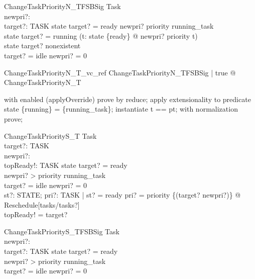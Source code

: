 \begin{schema}{ChangeTaskPriorityN\_TFSBSig}
  Task\\
  newpri?: \nat \\
  target?: TASK
\where
  state target? = ready \implies  newpri? \leq  priority running\_task\\
  state target? = running \implies  (\forall  t: state \inv  \limg  \{ready\} \rimg  @ newpri? \geq  priority t)\\
  state target? \neq  nonexistent\\
  target? = idle \implies  newpri? = 0
\end{schema}

\begin{theorem}{ChangeTaskPriorityN\_T\_vc\_ref}
\forall  ChangeTaskPriorityN\_TFSBSig | true @ \pre  ChangeTaskPriorityN\_T
\end{theorem}

\begin{zproof}
with enabled (applyOverride) prove by reduce;
apply extensionality to predicate state \inv  \limg  \{running\} \rimg  = \{running\_task\};
instantiate t == pt;
with normalization prove;
\end{zproof}

\begin{schema}{ChangeTaskPriorityS\_T}
  \Delta Task\\
  target?: TASK\\
  newpri?: \nat \\
  topReady!: TASK
\where
  state target? = ready\\
  newpri? > priority running\_task\\
  target? = idle \implies  newpri? = 0\\
  \exists  st?: STATE; pri?: TASK \fun  \nat  | st? = ready \land  pri? = priority \oplus  \{(target? \mapsto  newpri?)\} @ Reschedule[tasks/tasks?]\\
  topReady! = target?
\end{schema}

\begin{schema}{ChangeTaskPriorityS\_TFSBSig}
  Task\\
  newpri?: \nat \\
  target?: TASK
\where
  state target? = ready\\
  newpri? > priority running\_task\\
  target? = idle \implies  newpri? = 0
\end{schema}

